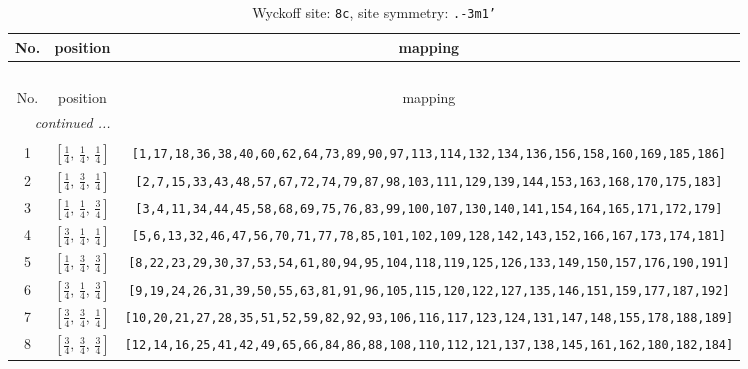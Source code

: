 \documentclass[fleqn,8pt]{jsarticle}
\begin{document}
\begin{longtable}{ccc}
\caption{Wyckoff site: {\tt 8c}, site symmetry: {\tt .-3m1'}}
 \\
 \hline \hline
No. & position & mapping \\ \hline \endfirsthead

\multicolumn{2}{l}{\tablename\ \thetable{}} \\
 \hline \hline
No. & position & mapping \\ \hline \endhead

 \hline \hline
\multicolumn{2}{r}{\footnotesize\it continued ...} \\ \endfoot

 \hline \hline
\multicolumn{2}{r}{} \\ \endlastfoot

1 & $\left[ \frac{1}{4},\, \frac{1}{4},\, \frac{1}{4} \right]$ & {\tt [1,17,18,36,38,40,60,62,64,73,89,90,97,113,114,132,134,136,156,158,160,169,185,186]} \\ \hline
2 & $\left[ \frac{1}{4},\, \frac{3}{4},\, \frac{1}{4} \right]$ & {\tt [2,7,15,33,43,48,57,67,72,74,79,87,98,103,111,129,139,144,153,163,168,170,175,183]} \\ \hline
3 & $\left[ \frac{1}{4},\, \frac{1}{4},\, \frac{3}{4} \right]$ & {\tt [3,4,11,34,44,45,58,68,69,75,76,83,99,100,107,130,140,141,154,164,165,171,172,179]} \\ \hline
4 & $\left[ \frac{3}{4},\, \frac{1}{4},\, \frac{1}{4} \right]$ & {\tt [5,6,13,32,46,47,56,70,71,77,78,85,101,102,109,128,142,143,152,166,167,173,174,181]} \\ \hline
5 & $\left[ \frac{1}{4},\, \frac{3}{4},\, \frac{3}{4} \right]$ & {\tt [8,22,23,29,30,37,53,54,61,80,94,95,104,118,119,125,126,133,149,150,157,176,190,191]} \\ \hline
6 & $\left[ \frac{3}{4},\, \frac{1}{4},\, \frac{3}{4} \right]$ & {\tt [9,19,24,26,31,39,50,55,63,81,91,96,105,115,120,122,127,135,146,151,159,177,187,192]} \\ \hline
7 & $\left[ \frac{3}{4},\, \frac{3}{4},\, \frac{1}{4} \right]$ & {\tt [10,20,21,27,28,35,51,52,59,82,92,93,106,116,117,123,124,131,147,148,155,178,188,189]} \\ \hline
8 & $\left[ \frac{3}{4},\, \frac{3}{4},\, \frac{3}{4} \right]$ & {\tt [12,14,16,25,41,42,49,65,66,84,86,88,108,110,112,121,137,138,145,161,162,180,182,184]} \\
\end{longtable}
\renewcommand{\arraystretch}{1.2}
\end{document}

